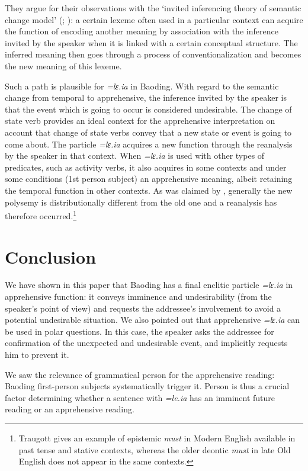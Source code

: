 \documentclass[output=paper,colorlinks,citecolor=brown, language=chinese]{langscibook}
\begin{document}
They argue for their observations with the `invited inferencing theory of semantic change model' (\cite[34--40]{TraugottDasher2002}; \cite[552--553]{Traugott2006}): a certain lexeme often used in a particular context can acquire the function of encoding another meaning by association with the inference invited by the speaker when it is linked with a certain conceptual structure. The inferred meaning then goes through a process of conventionalization and becomes the new meaning of this lexeme. 

Such a path is plausible for \textit{=lɛ.ia} in Baoding. With regard to the semantic change from temporal to apprehensive, the inference invited by the speaker is that the event which is going to occur is considered undesirable. The change of state verb provides an ideal context for the apprehensive interpretation on account that change of state verbs convey that a new state or event is going to come about. The particle \textit{=lɛ.ia} acquires a new function through the reanalysis by the speaker in that context. When \textit{=lɛ.ia} is used with other types of predicates, such as activity verbs, it also acquires in some contexts and under some conditions (1st person subject) an apprehensive meaning, albeit retaining the temporal function in other contexts. As was claimed by \citet[553]{Traugott2006}, generally the new polysemy is distributionally different from the old one and a reanalysis has therefore occurred.\footnote{Traugott gives an example of epistemic \textit{must} in Modern English available in past tense and stative contexts, whereas the older deontic \textit{must} in late Old English does not appear in the same contexts.}


\section{Conclusion}
\label{song-conclusion}

We have shown in this paper that Baoding has a final enclitic particle \textit{=lɛ.ia} in apprehensive function: it conveys imminence and undesirability (from the speaker's point of view) and requests the addressee's involvement to avoid a potential undesirable situation. We also pointed out that apprehensive \textit{=lɛ.ia} can be used in polar questions. In this case, the speaker asks the addressee for confirmation of the unexpected and undesirable event, and implicitly requests him to prevent it.

We saw the relevance of grammatical person for the apprehensive reading: Baoding first-person subjects systematically trigger it. Person is thus a crucial factor determining whether a sentence with \textit{=le.ia} has an imminent future reading or an apprehensive reading.
\end{document}
